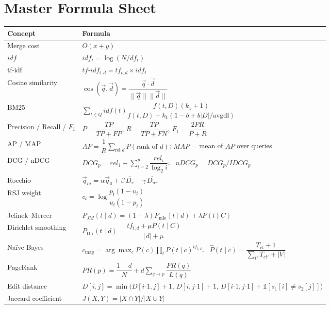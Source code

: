 \documentclass[11pt, a4paper]{article}
\begin{document}
\section{Master Formula Sheet}

\begin{center}
\small
\begin{tabular}{@{}p{3.6cm}p{10.8cm}@{}}
\toprule
\textbf{Concept} & \textbf{Formula} \\
\midrule
Merge cost & $O(x+y)$ \\
$idf$ & $idf_t = \log(N/df_t)$ \\
tf-idf & $tf\text{-}idf_{t,d} = tf_{t,d}\times idf_t$ \\
Cosine similarity & $\cos(\vec q,\vec d) = \dfrac{\vec q\cdot\vec d}{\lVert\vec q\rVert\lVert\vec d\rVert}$ \\
BM25 & $\sum_{t\in Q} idf(t)\dfrac{f(t,D)(k_1+1)}{f(t,D)+k_1(1-b+b|D|/\text{avgdl})}$ \\
Precision / Recall / $F_1$ & $P=\dfrac{TP}{TP+FP}$, $R=\dfrac{TP}{TP+FN}$, $F_1=\dfrac{2PR}{P+R}$ \\
AP / MAP & $AP=\dfrac1R\sum_{\text{rel } d} P(\text{rank of }d)$; $MAP$ = mean of $AP$ over queries \\
DCG / nDCG & $DCG_p=rel_1+\sum_{i=2}^p \dfrac{rel_i}{\log_2 i}$; \ $nDCG_p = DCG_p/IDCG_p$ \\
Rocchio & $\vec q_m = \alpha\vec q_0+\beta\,\overline{D_r}-\gamma\,\overline{D_{nr}}$ \\
RSJ weight & $c_t = \log\dfrac{p_t(1-u_t)}{u_t(1-p_t)}$ \\
Jelinek--Mercer & $P_{JM}(t\mid d) = (1-\lambda)P_{\text{mle}}(t\mid d)+\lambda P(t\mid C)$ \\
Dirichlet smoothing & $P_{\text{Dir}}(t\mid d) = \dfrac{tf_{t,d}+\mu P(t\mid C)}{|d|+\mu}$ \\
Na\"ive Bayes & $c_{\text{map}}=\arg\max_c P(c)\prod_t P(t\mid c)^{tf_{t,d}}$; \ $\hat P(t\mid c)=\dfrac{T_{ct}+1}{\sum_{t'}T_{ct'}+|V|}$ \\
PageRank & $PR(p)=\dfrac{1-d}{N}+d\sum_{q\to p}\dfrac{PR(q)}{L(q)}$ \\
Edit distance & $D[i,j]=\min\big(D[i\text{-}1,j]{+}1,\,D[i,j\text{-}1]{+}1,\,D[i\text{-}1,j\text{-}1]{+}\mathbb{1}[s_1[i]\ne s_2[j]]\big)$ \\
Jaccard coefficient & $J(X,Y) = |X\cap Y| / |X\cup Y|$ \\
\bottomrule
\end{tabular}
\end{center}
\end{document}
